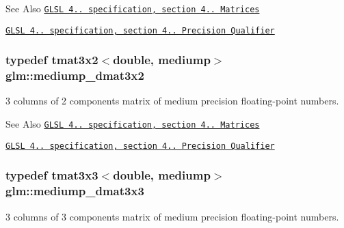 \begin{DoxySeeAlso}{See Also}
\href{http://www.opengl.org/registry/doc/GLSLangSpec.4.20.8.pdf}{\tt G\-L\-S\-L 4.. specification, section 4.. Matrices} 

\href{http://www.opengl.org/registry/doc/GLSLangSpec.4.20.8.pdf}{\tt G\-L\-S\-L 4.. specification, section 4.. Precision Qualifier} 
\end{DoxySeeAlso}
\hypertarget{group__core__precision_ga5ad217fad4f08abe72401409595076f2}{
\subsubsection[{mediump\-\_\-dmat3x2}]{\setlength{\rightskip}{0pt plus 5cm}typedef tmat3x2$<$double, mediump$>$ {\bf glm\-::mediump\-\_\-dmat3x2}}}\label{group__core__precision_ga5ad217fad4f08abe72401409595076f2}
3 columns of 2 components matrix of medium precision floating-\/point numbers.

\begin{DoxySeeAlso}{See Also}
\href{http://www.opengl.org/registry/doc/GLSLangSpec.4.20.8.pdf}{\tt G\-L\-S\-L 4.. specification, section 4.. Matrices} 

\href{http://www.opengl.org/registry/doc/GLSLangSpec.4.20.8.pdf}{\tt G\-L\-S\-L 4.. specification, section 4.. Precision Qualifier} 
\end{DoxySeeAlso}
\hypertarget{group__core__precision_ga7c4e98b7bf5674658ba5e0892e9bf531}{
\subsubsection[{mediump\-\_\-dmat3x3}]{\setlength{\rightskip}{0pt plus 5cm}typedef tmat3x3$<$double, mediump$>$ {\bf glm\-::mediump\-\_\-dmat3x3}}}\label{group__core__precision_ga7c4e98b7bf5674658ba5e0892e9bf531}
3 columns of 3 components matrix of medium precision floating-\/point numbers.

